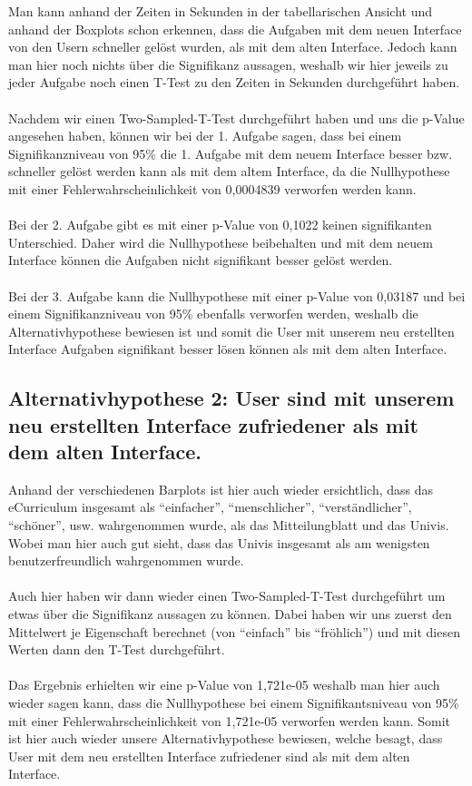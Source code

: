 \documentclass[a4paper,10pt]{scrartcl}
\begin{document}
Man kann anhand der Zeiten in Sekunden in der tabellarischen Ansicht und anhand der Boxplots schon erkennen, dass die Aufgaben
mit dem neuen Interface von den Usern schneller gelöst wurden, als mit dem alten Interface. Jedoch kann
man hier noch nichts über die Signifikanz aussagen, weshalb wir hier jeweils zu jeder Aufgabe noch einen T-Test zu den
Zeiten in Sekunden durchgeführt haben.
\\ \\
Nachdem wir einen Two-Sampled-T-Test durchgeführt haben und uns die p-Value angesehen haben, können wir bei
der 1. Aufgabe sagen, dass bei einem Signifikanzniveau von 95\% die 1. Aufgabe mit dem neuem Interface besser bzw. schneller gelöst werden
kann als mit dem altem Interface, da die Nullhypothese mit einer Fehlerwahrscheinlichkeit von 0,0004839 verworfen werden kann.
\\ \\
Bei der 2. Aufgabe gibt es mit einer p-Value von 0,1022 keinen signifikanten Unterschied. Daher wird die Nullhypothese beibehalten und
mit dem neuem Interface können die Aufgaben nicht signifikant besser gelöst werden.
\\ \\
Bei der 3. Aufgabe kann die Nullhypothese mit einer p-Value von 0,03187 und bei einem Signifikanzniveau von 95\% ebenfalls verworfen werden,
weshalb die Alternativhypothese bewiesen ist und somit die User mit unserem neu erstellten Interface Aufgaben signifikant besser lösen können
als mit dem alten Interface.

\subsection{Alternativhypothese 2: User sind mit unserem neu erstellten Interface zufriedener als mit dem alten Interface. }

Anhand der verschiedenen Barplots ist hier auch wieder ersichtlich, dass das eCurriculum insgesamt als ``einfacher'', ``menschlicher'', ``verständlicher'', ``schöner'', usw.
wahrgenommen wurde, als das Mitteilungblatt und das Univis. Wobei man hier auch gut sieht, dass das Univis insgesamt als am wenigsten benutzerfreundlich
wahrgenommen wurde. 
\\ \\
Auch hier haben wir dann wieder einen Two-Sampled-T-Test durchgeführt um etwas über die Signifikanz aussagen zu können. 
Dabei haben wir uns zuerst den Mittelwert je Eigenschaft
berechnet (von ``einfach'' bis ``fröhlich'') und mit diesen Werten dann den T-Test durchgeführt.
\\ \\
Das Ergebnis erhielten wir eine p-Value von 1,721e-05 weshalb man hier auch wieder sagen kann, dass die Nullhypothese bei
einem Signifikantsniveau von 95\% mit einer Fehlerwahrscheinlichkeit von 1,721e-05 verworfen werden kann. Somit ist hier auch wieder unsere
Alternativhypothese bewiesen, welche besagt, dass User mit dem neu erstellten Interface zufriedener sind als mit dem alten Interface.
\end{document}
